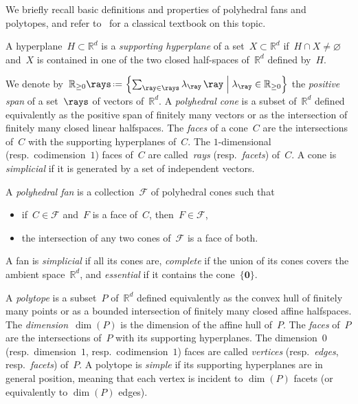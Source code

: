 \documentclass{amsart}
\theoremstyle{definition}
\newcommand{\R}{\mathbb{R}} %
\renewcommand{\b}[1]{{\boldsymbol{#1}}} %
\newcommand{\set}[2]{\left\{ #1 \;\middle|\; #2 \right\}} %
\newcommand{\eqdef}{\mbox{\,\raisebox{0.2ex}{\scriptsize\ensuremath{\mathrm:}}\ensuremath{=}\,}} %
\newcommand{\darkblue}{\color{darkblue}} %
\newcommand{\defn}[1]{\textsl{\darkblue #1}} %
\newcommand{\Fan}{\mathcal{F}} %
\begin{document}
We briefly recall basic definitions and properties of polyhedral fans and polytopes, and refer to~\cite{Ziegler-polytopes} for a classical textbook on this topic.

A hyperplane~$H \subset \R^d$ is a \defn{supporting hyperplane} of a set~$X \subset \R^d$ if~$H \cap X \ne \varnothing$ and~$X$ is contained in one of the two closed half-spaces of~$\R^d$ defined by~$H$.

We denote by~$\R_{\ge0}\rays \eqdef \set{\sum_{\ray \in \rays} \lambda_{\ray} \, \ray}{\lambda_{\ray} \in \R_{\ge0}}$ the \defn{positive span} of a set~$\rays$ of vectors of~$\R^d$.
A \defn{polyhedral cone} is a subset of~$\R^d$ defined equivalently as the positive span of finitely many vectors or as the intersection of finitely many closed linear halfspaces.
The \defn{faces} of a cone~$C$ are the intersections of~$C$ with the supporting hyperplanes of~$C$.
The $1$-dimensional (resp.~codimension~$1$) faces of~$C$ are called~\defn{rays} (resp.~\defn{facets}) of~$C$.
A cone is \defn{simplicial} if it is generated by a set of independent vectors.

A \defn{polyhedral fan} is a collection~$\Fan$ of polyhedral cones such that
\begin{itemize}
\item if~$C \in \Fan$ and~$F$ is a face of~$C$, then~$F \in \Fan$,
\item the intersection of any two cones of~$\Fan$ is a face of both.
\end{itemize}
A fan is \defn{simplicial} if all its cones are, \defn{complete} if the union of its cones covers the ambient space~$\R^d$, and \defn{essential} if it contains the cone~$\{\b{0}\}$.

A \defn{polytope} is a subset~$P$ of~$\R^d$ defined equivalently as the convex hull of finitely many points or as a bounded intersection of finitely many closed affine halfspaces.
The \defn{dimension}~$\dim(P)$ is the dimension of the affine hull of~$P$.
The \defn{faces} of~$P$ are the intersections of~$P$ with its supporting hyperplanes.
The dimension~$0$ (resp.~dimension~$1$, resp.~codimension~$1$) faces are called \defn{vertices} (resp.~\defn{edges}, resp.~\defn{facets}) of~$P$.
A polytope is \defn{simple} if its supporting hyperplanes are in general position, meaning that each vertex is incident to $\dim(P)$ facets (or equivalently to $\dim(P)$ edges).
\end{document}
